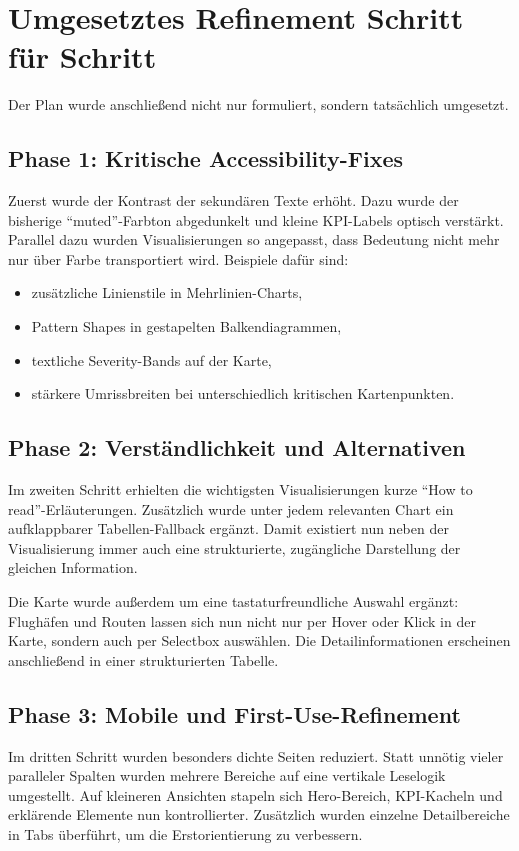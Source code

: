 \documentclass[11pt,a4paper]{article}
\begin{document}
\section{Umgesetztes Refinement Schritt für Schritt}
Der Plan wurde anschließend nicht nur formuliert, sondern tatsächlich umgesetzt.

\subsection{Phase 1: Kritische Accessibility-Fixes}
Zuerst wurde der Kontrast der sekundären Texte erhöht. Dazu wurde der bisherige ``muted''-Farbton abgedunkelt und kleine KPI-Labels optisch verstärkt. Parallel dazu wurden Visualisierungen so angepasst, dass Bedeutung nicht mehr nur über Farbe transportiert wird. Beispiele dafür sind:

\begin{itemize}[leftmargin=1.2cm]
\item zusätzliche Linienstile in Mehrlinien-Charts,
\item Pattern Shapes in gestapelten Balkendiagrammen,
\item textliche Severity-Bands auf der Karte,
\item stärkere Umrissbreiten bei unterschiedlich kritischen Kartenpunkten.
\end{itemize}

\subsection{Phase 2: Verständlichkeit und Alternativen}
Im zweiten Schritt erhielten die wichtigsten Visualisierungen kurze ``How to read''-Erläuterungen. Zusätzlich wurde unter jedem relevanten Chart ein aufklappbarer Tabellen-Fallback ergänzt. Damit existiert nun neben der Visualisierung immer auch eine strukturierte, zugängliche Darstellung der gleichen Information.

Die Karte wurde außerdem um eine tastaturfreundliche Auswahl ergänzt: Flughäfen und Routen lassen sich nun nicht nur per Hover oder Klick in der Karte, sondern auch per Selectbox auswählen. Die Detailinformationen erscheinen anschließend in einer strukturierten Tabelle.

\subsection{Phase 3: Mobile und First-Use-Refinement}
Im dritten Schritt wurden besonders dichte Seiten reduziert. Statt unnötig vieler paralleler Spalten wurden mehrere Bereiche auf eine vertikale Leselogik umgestellt. Auf kleineren Ansichten stapeln sich Hero-Bereich, KPI-Kacheln und erklärende Elemente nun kontrollierter. Zusätzlich wurden einzelne Detailbereiche in Tabs überführt, um die Erstorientierung zu verbessern.
\end{document}

